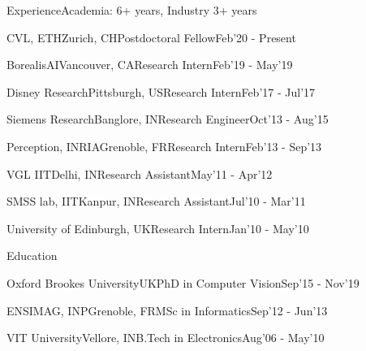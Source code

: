 \documentclass{resume} %
\begin{document}

\begin{paracol}{2}
\setlength{\columnsep}{2em}
\begin{rSection}{Experience}{\quad Academia: 6+ years, Industry 3+ years}
\begin{rSubsection}{CVL, ETH}{Zurich, CH}{Postdoctoral Fellow}{Feb'20 - Present}\end{rSubsection}
\begin{rSubsection}{BorealisAI}{Vancouver, CA}{Research Intern}{Feb'19 - May'19}\end{rSubsection}
\begin{rSubsection}{Disney Research}{Pittsburgh, US}{Research Intern}{Feb'17 - Jul'17}\end{rSubsection}
\begin{rSubsection}{Siemens Research}{Banglore, IN}{Research Engineer}{Oct'13 - Aug'15}\end{rSubsection}
\begin{rSubsection}{Perception, INRIA}{Grenoble, FR}{Research Intern}{Feb'13 - Sep'13}\end{rSubsection}
\begin{rSubsection}{VGL IIT}{Delhi, IN}{Research Assistant}{May'11 - Apr'12}\end{rSubsection}
\begin{rSubsection}{SMSS lab, IIT}{Kanpur, IN}{Research Assistant}{Jul'10 - Mar'11}\end{rSubsection}
\begin{rSubsection}{University of Edinburgh}{, UK}{Research Intern}{Jan'10 - May'10}\end{rSubsection}
\end{rSection}

\begin{rSection}{Education}{}
\begin{eSubsection}{Oxford Brookes University}{UK}{PhD in Computer Vision}{Sep'15 - Nov'19}\end{eSubsection}
\begin{eSubsection}{ENSIMAG, INP}{Grenoble, FR}{MSc in Informatics}{Sep'12 - Jun'13}\end{eSubsection}
\begin{eSubsection}{VIT University}{Vellore, IN}{B.Tech in Electronics}{Aug'06 - May'10}\end{eSubsection} 
\end{rSection}



\end{paracol}
\end{document}
